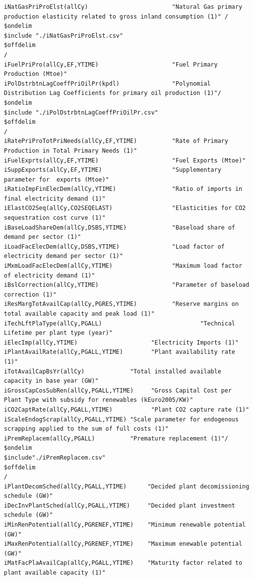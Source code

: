 \documentclass[a4paper,]{scrartcl}
\begin{document}
\begin{lstlisting}
iNatGasPriProElst(allCy)                        "Natural Gas primary production elasticity related to gross inland consumption (1)" /
$ondelim
$include "./iNatGasPriProElst.csv"
$offdelim
/
iFuelPriPro(allCy,EF,YTIME)                     "Fuel Primary Production (Mtoe)"
iPolDstrbtnLagCoeffPriOilPr(kpdl)               "Polynomial Distribution Lag Coefficients for primary oil production (1)"/
$ondelim
$include "./iPolDstrbtnLagCoeffPriOilPr.csv"
$offdelim
/
iRatePriProTotPriNeeds(allCy,EF,YTIME)          "Rate of Primary Production in Total Primary Needs (1)" 
iFuelExprts(allCy,EF,YTIME)                     "Fuel Exports (Mtoe)"   
iSuppExports(allCy,EF,YTIME)                    "Supplementary parameter for  exports (Mtoe)"
iRatioImpFinElecDem(allCy,YTIME)                "Ratio of imports in final electricity demand (1)"  
iElastCO2Seq(allCy,CO2SEQELAST)                 "Elasticities for CO2 sequestration cost curve (1)" 
iBaseLoadShareDem(allCy,DSBS,YTIME)             "Baseload share of demand per sector (1)"
iLoadFacElecDem(allCy,DSBS,YTIME)               "Load factor of electricity demand per sector (1)"
iMxmLoadFacElecDem(allCy,YTIME)                 "Maximum load factor of electricity demand (1)" 
iBslCorrection(allCy,YTIME)                     "Parameter of baseload correction (1)"
iResMargTotAvailCap(allCy,PGRES,YTIME)          "Reserve margins on total available capacity and peak load (1)"
iTechLftPlaType(allCy,PGALL)                            "Technical Lifetime per plant type (year)"
iElecImp(allCy,YTIME)                     "Electricity Imports (1)"
iPlantAvailRate(allCy,PGALL,YTIME)        "Plant availability rate (1)"
iTotAvailCapBsYr(allCy)             "Total installed available capacity in base year (GW)"
iGrossCapCosSubRen(allCy,PGALL,YTIME)     "Gross Capital Cost per Plant Type with subsidy for renewables (kEuro2005/KW)"        
iCO2CaptRate(allCy,PGALL,YTIME)           "Plant CO2 capture rate (1)"
iScaleEndogScrap(allCy,PGALL,YTIME) "Scale parameter for endogenous scrapping applied to the sum of full costs (1)" 
iPremReplacem(allCy,PGALL)          "Premature replacement (1)"/
$ondelim
$include"./iPremReplacem.csv"
$offdelim
/
iPlantDecomSched(allCy,PGALL,YTIME)      "Decided plant decomissioning schedule (GW)"
iDecInvPlantSched(allCy,PGALL,YTIME)     "Decided plant investment schedule (GW)"
iMinRenPotential(allCy,PGRENEF,YTIME)    "Minimum renewable potential (GW)" 
iMaxRenPotential(allCy,PGRENEF,YTIME)    "Maximum enewable potential (GW)"
iMatFacPlaAvailCap(allCy,PGALL,YTIME)    "Maturity factor related to plant available capacity (1)"

\end{lstlisting}
\end{document}
